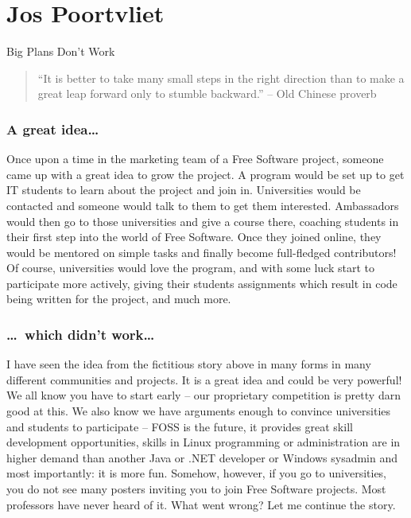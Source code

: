 
\chapter{Jos Poortvliet}{Big Plans Don't Work}

\begin{quote}``It is better to take many small steps in the right direction than
to make a great leap forward only to stumble backward.'' -- Old Chinese
proverb\end{quote}

\subsection*{A great idea\dots}
Once upon a time in the marketing team of a Free Software project, someone came
up with a great idea to grow the project. A program would be set up to get IT
students to learn about the project and join in. Universities would be contacted
and someone would talk to them to get them interested. Ambassadors would then go
to those universities and give a course there, coaching students in their first
step into the world of Free Software. Once they joined online, they would be
mentored on simple tasks and finally become full-fledged contributors! Of
course, universities would love the program, and with some luck start to
participate more actively, giving their students assignments which result in
code being written for the project, and much more.

\subsection*{\dots\ which didn't work\dots}
I have seen the idea from the fictitious story above in many forms in many
different communities and projects. It is a great idea and could be very
powerful! We all know you have to start early -- our proprietary competition is
pretty darn good at this. We also know we have arguments enough to convince
universities and students to participate -- FOSS is the future, it provides
great skill development opportunities, skills in Linux programming or
administration are in higher demand than another Java or .NET developer or
Windows sysadmin and most importantly: it is more fun. Somehow, however, if you go
to universities, you do not see many posters inviting you to join Free Software
projects. Most professors have never heard of it. What went wrong? Let me
continue the story.

